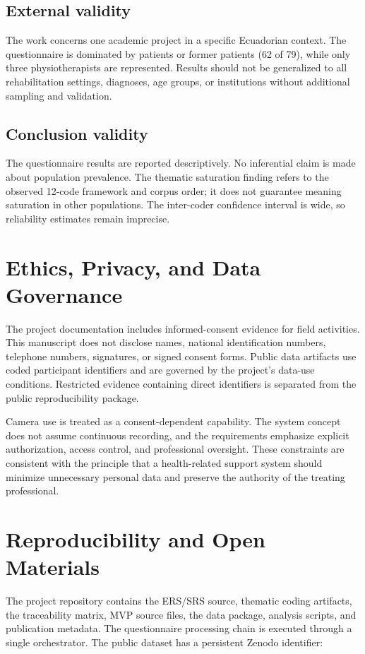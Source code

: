 \documentclass[10pt,a4paper]{article}
\begin{document}
\subsection{External validity}
The work concerns one academic project in a specific Ecuadorian context. The questionnaire is dominated by patients or former patients (62 of 79), while only three physiotherapists are represented. Results should not be generalized to all rehabilitation settings, diagnoses, age groups, or institutions without additional sampling and validation.

\subsection{Conclusion validity}
The questionnaire results are reported descriptively. No inferential claim is made about population prevalence. The thematic saturation finding refers to the observed 12-code framework and corpus order; it does not guarantee meaning saturation in other populations. The inter-coder confidence interval is wide, so reliability estimates remain imprecise.

\section{Ethics, Privacy, and Data Governance}
The project documentation includes informed-consent evidence for field activities. This manuscript does not disclose names, national identification numbers, telephone numbers, signatures, or signed consent forms. Public data artifacts use coded participant identifiers and are governed by the project's data-use conditions. Restricted evidence containing direct identifiers is separated from the public reproducibility package.

Camera use is treated as a consent-dependent capability. The system concept does not assume continuous recording, and the requirements emphasize explicit authorization, access control, and professional oversight. These constraints are consistent with the principle that a health-related support system should minimize unnecessary personal data and preserve the authority of the treating professional.

\section{Reproducibility and Open Materials}
The project repository contains the ERS/SRS source, thematic coding artifacts, the traceability matrix, MVP source files, the data package, analysis scripts, and publication metadata. The questionnaire processing chain is executed through a single orchestrator. The public dataset has a persistent Zenodo identifier:
\end{document}
